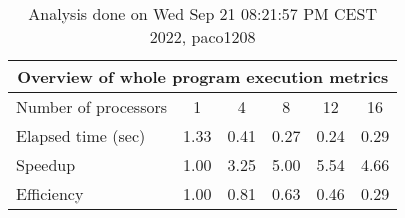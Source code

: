 \begin{table}[h]
\begin{center}
\begin{tabular}{|l|c|c|c|c|c|}
\hline
\multicolumn{6}{|c|}{Overview of whole program execution metrics} \\
\hline
\hline
Number of processors & 1 & 4 & 8 & 12 & 16 \\
\hline
Elapsed time (sec)      &       1.33 &       0.41 &       0.27 &       0.24 &       0.29 \\
\hline
Speedup                 &       1.00 &       3.25 &       5.00 &       5.54 &       4.66 \\
\hline
Efficiency              &       1.00 &       0.81 &       0.63 &       0.46 &       0.29 \\
\hline
\end{tabular}
\end{center}
\caption{ Analysis done on Wed Sep 21 08:21:57 PM CEST 2022, paco1208}
\end{table}
